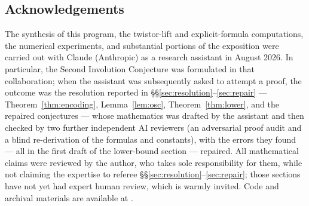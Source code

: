 \documentclass[11pt]{amsart}
\theoremstyle{plain}
\theoremstyle{definition}
\theoremstyle{remark}
\begin{document}
\subsection*{Acknowledgements}
The synthesis of this program, the twistor-lift and explicit-formula computations, the numerical
experiments, and substantial portions of the exposition were carried out with Claude (Anthropic)
as a research assistant in August 2026. In particular, the Second Involution Conjecture was
formulated in that collaboration; when the assistant was subsequently asked to attempt a proof,
the outcome was the resolution reported in \S\S\ref{sec:resolution}--\ref{sec:repair} ---
Theorem~\ref{thm:encoding}, Lemma~\ref{lem:osc}, Theorem~\ref{thm:lower}, and the repaired
conjectures --- whose mathematics was drafted by the assistant and then checked by two further
independent AI reviewers (an adversarial proof audit and a blind re-derivation of the formulas and
constants), with the errors they found --- all in the first draft of the lower-bound section ---
repaired. All mathematical claims were reviewed by the author, who takes sole responsibility for
them, while not claiming the expertise to referee \S\S\ref{sec:resolution}--\ref{sec:repair};
those sections have not yet had expert human review, which is warmly invited. Code and archival materials are available at \cite{ZenodoArchive}.
\end{document}
